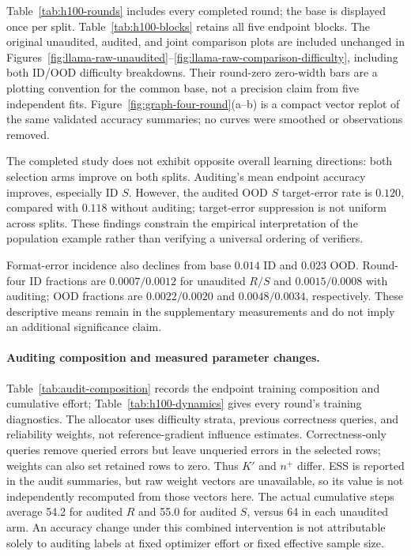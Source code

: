 


Table~\ref{tab:h100-rounds} includes every completed round; the base
is displayed once per split. Table~\ref{tab:h100-blocks} retains all
five endpoint blocks. The original unaudited, audited, and joint comparison
plots are included unchanged in
Figures~\ref{fig:llama-raw-unaudited}--\ref{fig:llama-raw-comparison-difficulty},
including both ID/OOD difficulty breakdowns. Their round-zero zero-width
bars are a plotting convention for
the common base, not a precision claim from five independent fits.
Figure~\ref{fig:graph-four-round}(a--b) is a compact vector replot of the same validated
accuracy summaries; no curves were smoothed or observations removed.

The completed study does not exhibit opposite overall learning directions:
both selection arms improve on both splits.
Auditing's mean endpoint accuracy improves, especially ID $S$. However, the
audited OOD $S$ target-error rate is $0.120$, compared with $0.118$
without auditing; target-error suppression is not uniform across splits.
These findings constrain the empirical interpretation of the population
example rather than verifying a universal ordering of verifiers.

Format-error incidence also declines from base $0.014$ ID and $0.023$
OOD. Round-four ID fractions are $0.0007/0.0012$ for unaudited $R/S$
and $0.0015/0.0008$ with auditing; OOD fractions are $0.0022/0.0020$
and $0.0048/0.0034$, respectively. These descriptive means remain in
the supplementary measurements and do not imply an additional significance claim.




\paragraph{Auditing composition and measured parameter changes.}
Table~\ref{tab:audit-composition} records the endpoint training composition
and cumulative effort; Table~\ref{tab:h100-dynamics} gives every round's
training diagnostics. The allocator uses difficulty strata, previous
correctness queries, and reliability weights, not reference-gradient
influence estimates. Correctness-only queries remove queried errors but
leave unqueried errors in the selected rows; weights can also set retained
rows to zero. Thus $K'$ and $n^+$ differ. ESS is reported in the audit
summaries, but raw weight vectors are unavailable, so
its value is not independently recomputed from those vectors here.
The actual cumulative steps average 54.2 for audited $R$ and 55.0 for
audited $S$, versus 64 in each unaudited arm. An accuracy change under
this combined intervention is not attributable solely to auditing labels
at fixed optimizer effort or fixed effective sample size.

